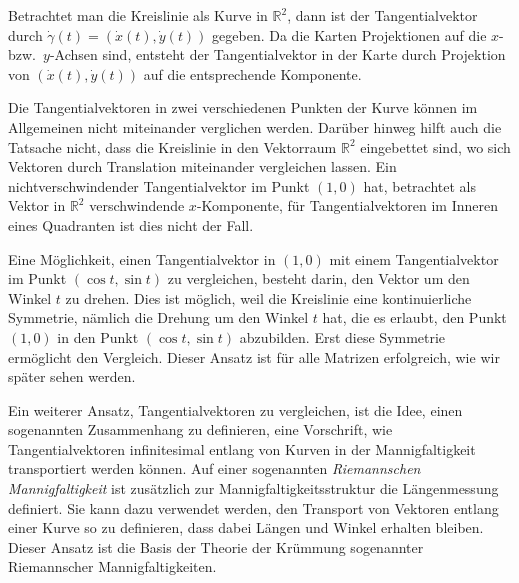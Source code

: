Betrachtet man die Kreislinie als Kurve in $\mathbb{R}^2$,
dann ist der Tangentialvektor durch
$\dot{\gamma}(t)=(\dot{x}(t),\dot{y}(t))$ gegeben.
Da die Karten Projektionen auf die $x$- bzw.~$y$-Achsen sind,
entsteht der Tangentialvektor in der Karte durch Projektion
von $(\dot{x}(t),\dot{y}(t))$ auf die entsprechende Komponente.

Die Tangentialvektoren in zwei verschiedenen Punkten der Kurve können
im Allgemeinen nicht miteinander verglichen werden.
Darüber hinweg hilft auch die Tatsache nicht, dass die Kreislinie
in den Vektorraum $\mathbb{R}^2$ eingebettet sind, wo sich Vektoren
durch Translation miteinander vergleichen lassen.
Ein nichtverschwindender Tangentialvektor im Punkt $(1,0)$ hat, 
betrachtet als Vektor in $\mathbb{R}^2$ verschwindende $x$-Komponente,
für Tangentialvektoren im Inneren eines Quadranten ist dies nicht
der Fall.

Eine Möglichkeit, einen Tangentialvektor in $(1,0)$ mit einem
Tangentialvektor im Punkt $(\cos t,\sin t)$ zu vergleichen, besteht
darin, den Vektor um den Winkel $t$ zu drehen.
Dies ist möglich, weil die Kreislinie eine kontinuierliche Symmetrie,
nämlich die Drehung um den Winkel $t$ hat, die es erlaubt, den Punkt $(1,0)$
in den Punkt $(\cos t,\sin t)$ abzubilden.
Erst diese Symmetrie ermöglicht den Vergleich.
Dieser Ansatz ist für alle Matrizen erfolgreich, wie wir später sehen werden.

Ein weiterer Ansatz, Tangentialvektoren zu vergleichen, ist die Idee, 
einen sogenannten Zusammenhang zu definieren, eine Vorschrift, wie
Tangentialvektoren infinitesimal entlang von Kurven in der Mannigfaltigkeit
transportiert werden können.
Auf einer sogenannten {\em Riemannschen Mannigfaltigkeit} ist zusätzlich
zur Mannigfaltigkeitsstruktur die Längenmessung definiert.
Sie kann dazu verwendet werden, den Transport von Vektoren entlang einer
Kurve so zu definieren, dass dabei Längen und Winkel erhalten bleiben.
Dieser Ansatz ist die Basis der Theorie der Krümmung sogenannter
Riemannscher Mannigfaltigkeiten.








